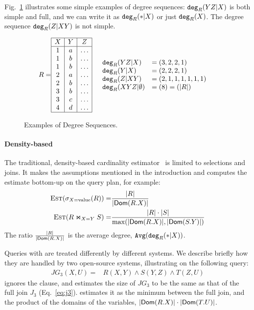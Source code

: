 Fig.~\ref{fig:degree} illustrates some simple examples of degree
sequences: $\texttt{deg}_R(YZ|X)$ is both simple and full, and we can write
it as $\texttt{deg}_R(*|X)$ or just $\texttt{deg}_R(X)$. The degree sequence
$\texttt{deg}_R(Z|XY)$ is not simple.

\begin{figure}
  \centering
    \begin{align*}
      R=&\begin{array}[c]{|c|c|c|} \hline X&Y&Z \\ \hline
         1&a&\ldots \\
         1&b&\ldots \\
         1&b&\ldots \\
         2&a&\ldots \\
         2&b&\ldots \\
         3&b&\ldots \\
         3&c&\ldots \\
         4&d&\ldots \\ \hline
    \end{array}
&&
   \begin{array}[c]{ll}
     \texttt{deg}_R(YZ|X)&=(3,2,2,1)\\
     \texttt{deg}_R(Y|X) &= (2,2,2,1)\\
     \texttt{deg}_R(Z|XY)&=(2,1,1,1,1,1,1)\\
     \texttt{deg}_R(XYZ|\emptyset)&=(8)=(|R|)
   \end{array}
    \end{align*}
    \caption{Examples of Degree Sequences.}
  \label{fig:degree}
\end{figure}


\paragraph{Density-based \ce}
The traditional, density-based cardinality estimator~\cite{DBLP:books/daglib/0020812} is
limited to selections and joins.  It makes the assumptions mentioned
in the introduction and computes the estimate bottom-up on the query
plan, for example:
%
\begin{align*}
  \textsc{Est}(\sigma_{X=\text{value}}(R)) = & \frac{|R|}{|\textsf{Dom}(R.X)|} \\
  \textsc{Est}(R \Join_{X=Y} S) = & \frac{|R|\cdot|S|}{\max(|\textsf{Dom}(R.X)|,|\textsf{Dom}(S.Y)|)}
\end{align*}
%
The ratio $\frac{|R|}{|\textsf{Dom}(R.X)|}$ is the average degree,
$\texttt{Avg}(\texttt{deg}_R(*|X))$.

Queries with \groupby are treated differently by different systems.
We describe briefly how they are handled by two open-source systems,
illustrating on the following \groupby query:
%
\begin{align}
    JG_3(X,U) = & R(X,Y) \wedge S(Y,Z) \wedge T(Z, U) \label{eq:jg3}
\end{align}
%
\duckdb ignores the \groupby clause, and estimates the size of $JG_3$
to be the same as that of the full join $J_3$ (Eq.~\eqref{eq:j3}).
\psql estimates it as the minimum between the full join, and the
product of the domains of the \groupby variables,
$|\textsf{Dom}(R.X)|\cdot |\textsf{Dom}(T.U)|$.


